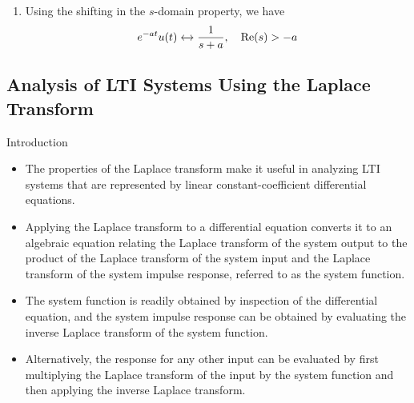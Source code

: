 \begin{frame}[allowframebreaks]{}
{\begin{enumerate}
              \begin{align*}
                tu(t) &\xleftrightarrow{}  -\frac{d}{ds}\left(\frac{1}{s}\right) = \frac{1}{s^2}, \quad \mathrm{Re}(s)>0\\
              \end{align*}
              \pause
          \item Using the shifting in the $s$-domain property, we have
              \begin{align*}
                e^{-at}u(t) &\xleftrightarrow{}  \frac{1}{s+a}, \quad \mathrm{Re}(s)>-a\\
              \end{align*}
        \end{enumerate}

    }
\end{frame}



\subsection{Analysis of LTI Systems Using the Laplace Transform}

\begin{frame}{Introduction}
    \begin{itemize}
        \item The properties of the Laplace transform make it useful in analyzing LTI systems that are represented by linear constant-coefficient differential equations.
        \item Applying the Laplace transform to a differential equation converts it to an algebraic equation relating the Laplace transform of the system output to the product of the Laplace transform of the system input and the Laplace transform of the system impulse response, referred to as the system function.
        \item The system function is readily obtained by inspection of the differential equation, and the system impulse response can be obtained by evaluating the inverse Laplace transform of the system function.
        \item Alternatively, the response for any other input can be evaluated by first multiplying the Laplace transform of the input by the system function and then applying the inverse Laplace transform.
    \end{itemize}
\end{frame}

